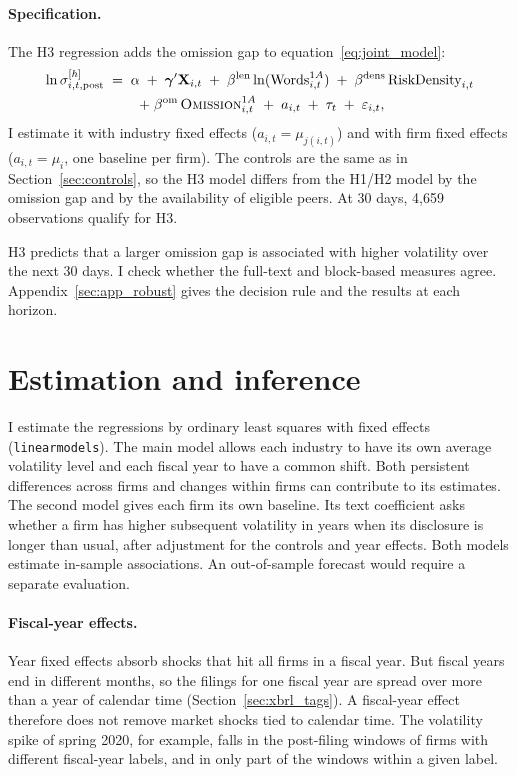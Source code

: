 \paragraph{Specification.} The H3 regression adds the omission gap to
equation~\eqref{eq:joint_model}:
\begin{multline}
\ln \sigma_{i,t,\mathrm{post}}^{[h]} \;=\; \alpha
\;+\; \boldsymbol{\gamma}' \mathbf{X}_{i,t}
\;+\; \beta^{\text{len}} \ln(\text{Words}^{1A}_{i,t})
\;+\; \beta^{\text{dens}} \,\text{RiskDensity}_{i,t} \\
\;+\; \beta^{\text{om}} \,\textsc{Omission}^{1A}_{i,t}
\;+\; a_{i,t} \;+\; \tau_t
\;+\; \varepsilon_{i,t},
\label{eq:silence_model}
\end{multline}
I estimate it with industry fixed effects ($a_{i,t}=\mu_{j(i,t)}$) and with firm fixed
effects ($a_{i,t}=\mu_i$, one baseline per firm). The controls are the same as in
Section~\ref{sec:controls}, so the H3 model differs from the H1/H2 model
by the omission gap and by the availability of eligible peers. At 30 days, 4{,}659 observations qualify for H3.

H3 predicts that a larger omission gap is associated with higher volatility over the next 30 days. I check whether the full-text and block-based measures agree. Appendix~\ref{sec:app_robust} gives the decision rule and the results at each horizon.

\section{Estimation and inference}
\label{sec:estimation}

I estimate the regressions by ordinary least squares with fixed effects (\texttt{linearmodels}). 
The main model allows each industry to have its own average volatility 
level and each fiscal year to have a common shift. Both persistent differences 
across firms and changes within firms can contribute to its estimates. 
The second model gives each firm its own baseline. Its text coefficient asks 
whether a firm has higher subsequent volatility in years when its disclosure 
is longer than usual, after adjustment for the controls and year effects. 
Both models estimate in-sample associations. An out-of-sample forecast would 
require a separate evaluation.

\paragraph{Fiscal-year effects.} Year fixed effects absorb shocks that hit all
firms in a fiscal year. But fiscal years end in different months, so the
filings for one fiscal year are spread over more than a year of calendar
time (Section~\ref{sec:xbrl_tags}). A fiscal-year effect therefore does not
remove market shocks tied to calendar time. The volatility spike of spring
2020, for example, falls in the post-filing windows of firms with different
fiscal-year labels, and in only part of the windows within a given label.

